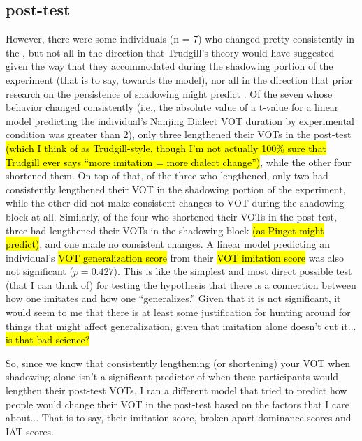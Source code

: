 \subsection{post-test}
However, there were some individuals (n = 7) who changed pretty consistently in the , but not all in the direction that Trudgill's theory would have suggested given the way that they accommodated during the shadowing portion of the experiment (that is to say, towards the model), nor all in the direction that prior research on the persistence of shadowing might predict \citep{pinget2015actuation}. Of the seven whose behavior changed consistently (i.e., the absolute value of a t-value for a linear model predicting the individual's Nanjing Dialect VOT duration by experimental condition was greater than 2), only three lengthened their VOTs in the post-test \hl{(which I think of as Trudgill-style, though I'm not actually 100\% sure that Trudgill ever says ``more imitation = more dialect change'')}, while the other four shortened them. On top of that, of the three who lengthened, only two had consistently lengthened their VOT in the shadowing portion of the experiment, while the other did not make consistent changes to VOT during the shadowing block at all. Similarly, of the four who shortened their VOTs in the post-test, three had lengthened their VOTs in the shadowing block \hl{(as Pinget might predict)}, and one made no consistent changes. A linear model predicting an individual's \hl{VOT generalization score} from their \hl{VOT imitation score} was also not significant ($p = 0.427$).%
This is like the simplest and most direct possible test (that I can think of) for testing the hypothesis that there is a connection between how one imitates and how one ``generalizes.''%
Given that it is not significant, it would seem to me that there is at least some justification for hunting around for things that might affect generalization, given that imitation alone doesn't cut it... \hl{is that bad science?}%

So, since we know that consistently lengthening (or shortening) your VOT when shadowing alone isn't a significant predictor of when these participants would lengthen their post-test VOTs, I ran a different model that tried to predict how people would change their VOT in the post-test based on the factors that I care about... That is to say, their imitation score, broken apart dominance scores and IAT scores.

